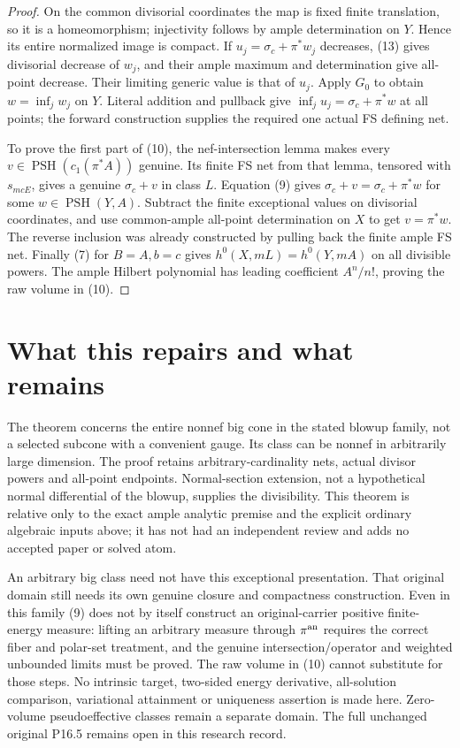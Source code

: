 \documentclass[11pt]{article}
\newcommand{\PSH}{\operatorname{PSH}}
\begin{document}
\begin{proof}
On the common divisorial coordinates the map is fixed finite
translation, so it is a homeomorphism; injectivity follows by
ample determination on $Y$. Hence its entire normalized image is
compact. If $u_j=\sigma_c+\pi^*w_j$ decreases, (13) gives
divisorial decrease of $w_j$, and their ample maximum and
determination give all-point decrease. Their limiting generic
value is that of $u_j$. Apply $G_0$ to obtain
$w=\inf_j w_j$ on $Y$. Literal addition and pullback give
$\inf_j u_j=\sigma_c+\pi^*w$ at all points; the forward
construction supplies the required one actual FS defining net.

To prove the first part of (10), the nef-intersection lemma makes
every $v\in\PSH(c_1(\pi^*A))$ genuine. Its finite FS net from
that lemma, tensored with $s_{mcE}$, gives a genuine
$\sigma_c+v$ in class $L$. Equation (9) gives
$\sigma_c+v=\sigma_c+\pi^*w$ for some $w\in\PSH(Y,A)$.
Subtract the finite exceptional values on divisorial coordinates,
and use common-ample all-point determination on $X$ to get
$v=\pi^*w$. The reverse inclusion was already constructed by
pulling back the finite ample FS net. Finally (7) for $B=A,b=c$
gives $h^0(X,mL)=h^0(Y,mA)$ on all divisible powers. The ample
Hilbert polynomial has leading coefficient $A^n/n!$, proving
the raw volume in (10).
\end{proof}

\section{What this repairs and what remains}
The theorem concerns the entire nonnef big cone in the stated
blowup family, not a selected subcone with a convenient gauge.
Its class can be nonnef in arbitrarily large dimension. The proof
retains arbitrary-cardinality nets, actual divisor powers and
all-point endpoints. Normal-section extension, not a hypothetical
normal differential of the blowup, supplies the divisibility.
This theorem is relative only to the exact ample analytic premise
and the explicit ordinary algebraic inputs above; it has not had
an independent review and adds no accepted paper or solved atom.

An arbitrary big class need not have this exceptional presentation.
That original domain still needs its own genuine closure and
compactness construction. Even in this family (9) does not by itself
construct an original-carrier positive finite-energy measure:
lifting an arbitrary measure through $\pi^{\rm an}$ requires
the correct fiber and polar-set treatment, and the genuine
intersection/operator and weighted unbounded limits must be proved.
The raw volume in (10) cannot substitute for those steps.
No intrinsic target, two-sided energy derivative, all-solution
comparison, variational attainment or uniqueness assertion is made
here. Zero-volume pseudoeffective classes remain a separate domain.
The full unchanged original P16.5 remains open in this research record.
\end{document}
